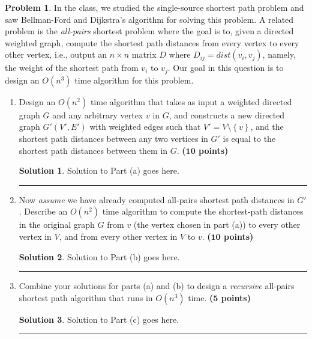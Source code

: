 \documentclass{article}
\theoremstyle{definition}
\newtheorem{problem}{Problem}
\def\fline{\rule{0.75\linewidth}{0.5pt}}
\newcommand{\finishline}{\vspace{-15pt}\begin{center}\fline\end{center}}
\newtheorem*{solution*}{Solution}
\newenvironment{solution}{\begin{solution*}}{{\finishline} \end{solution*}}
\newcommand{\grade}[1]{\hfill{\textbf{($\mathbf{#1}$ points)}}}
\newcommand{\set}[1]{\ensuremath{\left\{ #1 \right\}}}
\begin{document}
\begin{problem}
In the class, we studied the single-source shortest path problem and saw Bellman-Ford and Dijkstra's algorithm for solving this problem. A related problem is the \emph{all-pairs} shortest problem where the goal is to, given a directed weighted graph, compute the shortest path distances from every vertex to every other vertex, i.e., output
an $n \times n$ matrix $D$ where $D_{ij} = dist(v_i,v_j)$, namely, the weight of the shortest path from $v_i$ to $v_j$. Our goal in this question is to design an $O(n^3)$ time algorithm for this problem. 

\begin{enumerate}[label=(\alph*)]
\item Design an $O(n^2)$ time algorithm that takes as input a weighted directed graph $G$ and any arbitrary vertex $v$ in $G$, and constructs a new directed graph $G'(V', E')$ with weighted edges such that $V' = V \setminus \set{v}$, and 
the shortest path distances between any two vertices in $G'$ is equal to the shortest path distances between them in $G$. \grade{10}

\begin{solution}
	Solution to Part (a) goes here.  
\end{solution}

\item Now \emph{assume} we have already computed all-pairs shortest path distances in $G'$. Describe an $O(n^2)$ time algorithm to compute the shortest-path distances in the original graph $G$ from $v$ (the vertex
chosen in part (a)) to every other vertex in $V$, and from every other vertex in $V$ to $v$. \grade{10}

\begin{solution}
	Solution to Part (b) goes here.  
\end{solution}

\item Combine your solutions for parts (a) and (b) to design a \emph{recursive} all-pairs shortest path algorithm that runs in $O(n^3)$ time. \grade{5}

\begin{solution}
	Solution to Part (c) goes here.  
\end{solution}

\end{enumerate}

\end{problem}
\end{document}
